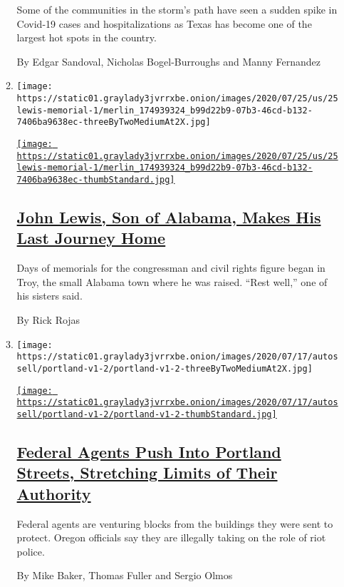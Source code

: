 \begin{enumerate}
\begin{enumerate}
    Some of the communities in the storm's path have seen a sudden spike
    in Covid-19 cases and hospitalizations as Texas has become one of
    the largest hot spots in the country.

    By Edgar Sandoval, Nicholas Bogel-Burroughs and Manny Fernandez
  \item
    \texttt{[image: https://static01.graylady3jvrrxbe.onion/images/2020/07/25/us/25lewis-memorial-1/merlin\_174939324\_b99d22b9-07b3-46cd-b132-7406ba9638ec-threeByTwoMediumAt2X.jpg]}

    \href{/2020/07/25/us/john-lewis-memorial-service.html}{\texttt{[image: https://static01.graylady3jvrrxbe.onion/images/2020/07/25/us/25lewis-memorial-1/merlin\_174939324\_b99d22b9-07b3-46cd-b132-7406ba9638ec-thumbStandard.jpg]}}

    \hypertarget{john-lewis-son-of-alabama-makes-his-last-journey-home}{%
    \subsection{\texorpdfstring{\href{/2020/07/25/us/john-lewis-memorial-service.html}{John
    Lewis, Son of Alabama, Makes His Last Journey
    Home}}{John Lewis, Son of Alabama, Makes His Last Journey Home}}\label{john-lewis-son-of-alabama-makes-his-last-journey-home}}

    Days of memorials for the congressman and civil rights figure began
    in Troy, the small Alabama town where he was raised. ``Rest well,''
    one of his sisters said.

    By Rick Rojas
  \item
    \texttt{[image: https://static01.graylady3jvrrxbe.onion/images/2020/07/17/autossell/portland-v1-2/portland-v1-2-threeByTwoMediumAt2X.jpg]}

    \href{/2020/07/25/us/portland-federal-legal-jurisdiction-courts.html}{\texttt{[image: https://static01.graylady3jvrrxbe.onion/images/2020/07/17/autossell/portland-v1-2/portland-v1-2-thumbStandard.jpg]}}

    \hypertarget{federal-agents-push-into-portland-streets-stretching-limits-of-their-authority}{%
    \subsection{\texorpdfstring{\href{/2020/07/25/us/portland-federal-legal-jurisdiction-courts.html}{Federal
    Agents Push Into Portland Streets, Stretching Limits of Their
    Authority}}{Federal Agents Push Into Portland Streets, Stretching Limits of Their Authority}}\label{federal-agents-push-into-portland-streets-stretching-limits-of-their-authority}}

    Federal agents are venturing blocks from the buildings they were
    sent to protect. Oregon officials say they are illegally taking on
    the role of riot police.

    By Mike Baker, Thomas Fuller and Sergio Olmos
  \end{enumerate}
\end{enumerate}

